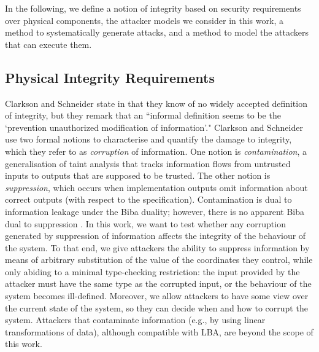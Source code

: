 In the following, we define a notion of integrity based on security requirements over physical components, the attacker models we consider in this work, a method to systematically generate attacks, and a method to model the attackers that can execute them. 

\subsection{Physical Integrity Requirements}{
{
Clarkson and Schneider state in \cite{QuantitativeIntegrity} that they know of no widely accepted definition of integrity, but they remark that an ``informal definition seems to be the `prevention unauthorized modification of information'." Clarkson and Schneider use two formal notions to characterise and quantify the {damage to integrity}, which they refer to as \emph{corruption} of information. One notion is \emph{contamination}, a generalisation of taint analysis that tracks information flows from untrusted inputs to outputs that are supposed to be trusted. The other notion is \emph{suppression}, which occurs when implementation outputs omit information about correct outputs (with respect to the specification). Contamination is dual to information leakage under the Biba duality; however, there is no apparent Biba dual to suppression \cite{BibaIntegrity}. 
}
In this work, we want to test whether any corruption generated by suppression of information affects the integrity of the behaviour of the system. To that end, we %
give attackers the ability to suppress information by means of arbitrary substitution of the value of the coordinates they control, while only abiding to a minimal type-checking restriction: the input provided by the attacker must have the same type as the corrupted input, or the behaviour of the system becomes ill-defined. Moreover, we allow attackers to have some view over the current state of the system, so they can decide when and how to corrupt the system. Attackers that contaminate information (e.g., by using linear transformations of data), although compatible with LBA, are beyond the scope of this work. 

}
